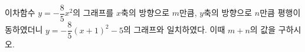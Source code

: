 이차함수 $y=-\dfrac{8}{5}x^2$의 그래프를 $x$축의 방향으로 $m$만큼, $y$축의 방향으로 $n$만큼 평행이동하였더니 $y=-\dfrac{8}{5}(x+1)^2-5$의 그래프와 일치하였다. 이때 $m+n$의 값을 구하시오.

